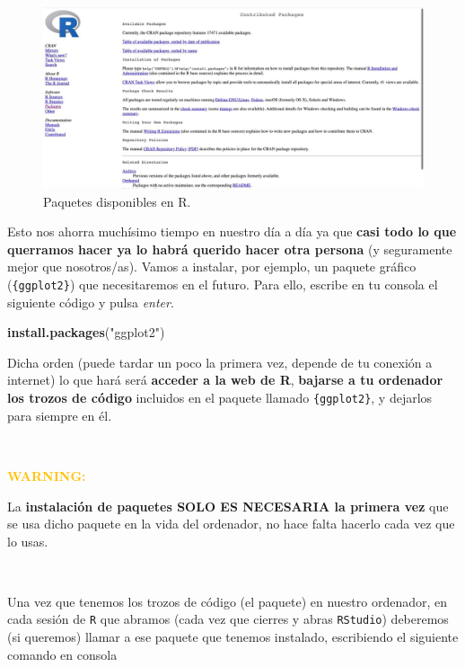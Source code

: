 \documentclass[11pt,]{book}
\newenvironment{Shaded}{\begin{snugshade}}{\end{snugshade}}
\newcommand{\KeywordTok}[1]{\textcolor[rgb]{0.27,0.27,0.27}{\textbf{#1}}}
\newcommand{\NormalTok}[1]{#1}
\newcommand{\StringTok}[1]{\textcolor[rgb]{0.5,0.5,0.5}{#1}}
\begin{document}
\begin{figure}

{\centering \includegraphics[width=0.7\linewidth]{./img/paquetes_R} 

}

\caption{Paquetes disponibles en R.}\label{fig:paquetes-R}
\end{figure}

Esto nos ahorra muchísimo tiempo en nuestro día a día ya que \textbf{casi todo lo que querramos hacer ya lo habrá querido hacer otra persona} (y seguramente mejor que nosotros/as). Vamos a instalar, por ejemplo, un paquete gráfico (\texttt{\{ggplot2\}}) que necesitaremos en el futuro. Para ello, escribe en tu consola el siguiente código y pulsa \emph{enter}.

\begin{Shaded}
\begin{Highlighting}[]
\KeywordTok{install.packages}\NormalTok{(}\StringTok{"ggplot2"}\NormalTok{)}
\end{Highlighting}
\end{Shaded}

Dicha orden (puede tardar un poco la primera vez, depende de tu conexión a internet) lo que hará será \textbf{acceder a la web de R}, \textbf{bajarse a tu ordenador los trozos de código} incluidos en el paquete llamado \texttt{\{ggplot2\}}, y dejarlos para siempre en él.

~

\textbf{\textcolor{#ffc107}{WARNING:}}

La \textbf{instalación de paquetes SOLO ES NECESARIA la primera vez} que se usa dicho paquete en la vida del ordenador, no hace falta hacerlo cada vez que lo usas.

~

Una vez que tenemos los trozos de código (el paquete) en nuestro ordenador, en cada sesión de \texttt{R} que abramos (cada vez que cierres y abras \texttt{RStudio}) deberemos (si queremos) llamar a ese paquete que tenemos instalado, escribiendo el siguiente comando en consola
\end{document}

